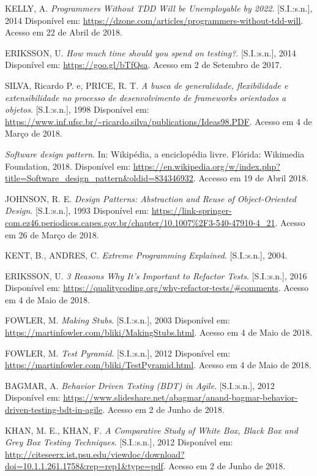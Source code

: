 \documentclass[
    12pt,       %
    openright,      %
    twoside,      %
    a4paper,      %
    english,      %
    french,       %
    spanish,      %
    brazil,       %
    ]{abntex2}
\begin{document}
  \noindent
  KELLY, A. \textit{Programmers Without TDD Will be Unemployable by 2022}. [S.I.:s.n.],
  2014 Disponível em: \url{https://dzone.com/articles/programmers-without-tdd-will}. Acesso em 22 de Abril de 2018.

  \noindent
  ERIKSSON, U. \textit{How much time should you spend on testing?}. [S.I.:s.n.], 2014 Disponível em:
  \url{https://goo.gl/bTfQsa}. Acesso em 2 de Setembro de 2017.

  \noindent
  SILVA, Ricardo P. e, PRICE, R. T. \textit{A busca de generalidade, flexibilidade e extensibilidade no processo de desenvolvimento de frameworks orientados a objetos}. [S.I.:s.n.], 1998 Disponível em: \url{https://www.inf.ufsc.br/~ricardo.silva/publications/Ideas98.PDF}. Acesso em 4 de Março de 2018.

  \noindent
  \textit{Software design pattern}. In: Wikipédia, a enciclopédia livre. Flórida: Wikimedia Foundation,
  2018. Disponível em:
  \url{https://en.wikipedia.org/w/index.php?title=Software_design_pattern&oldid=834346932}. Accesso
  em 19 de Abril 2018.

  \noindent
  JOHNSON, R. E. \textit{Design Patterns: Abstraction and Reuse of Object-Oriented Design}. [S.I.:s.n.], 1993 Disponível em: \url{https://link-springer-com.ez46.periodicos.capes.gov.br/chapter/10.1007%2F3-540-47910-4_21}. Acesso em 26 de Março de 2018.

  \noindent
  KENT, B., ANDRES, C. \textit{Extreme Programming Explained}. [S.I.:s.n.], 2004.

  \noindent
  ERIKSSON, U. \textit{3 Reasons Why It's Important to Refactor Tests}. [S.I.:s.n.], 2016 Disponível em:
  \url{https://qualitycoding.org/why-refactor-tests/#comments}. Acesso em 4 de Maio de 2018.

  \noindent
  FOWLER, M. \textit{Making Stubs}. [S.I.:s.n.], 2003 Disponível em:
  \url{https://martinfowler.com/bliki/MakingStubs.html}. Acesso em 4 de Maio de 2018.

  \noindent
  FOWLER, M. \textit{Test Pyramid}. [S.I.:s.n.], 2012 Disponível em:
  \url{https://martinfowler.com/bliki/TestPyramid.html}. Acesso em 4 de Maio de 2018.

  \noindent
  BAGMAR, A. \textit{Behavior Driven Testing (BDT) in Agile}. [S.I.:s.n.], 2012 Disponível em:
  \url{https://www.slideshare.net/abagmar/anand-bagmar-behavior-driven-testing-bdt-in-agile}. Acesso em 2 de Junho de 2018.

  \noindent
  KHAN, M. E., KHAN, F. \textit{A Comparative Study of White Box, Black Box and Grey Box Testing Techniques}. [S.I.:s.n.], 2012 Disponível em: \url{http://citeseerx.ist.psu.edu/viewdoc/download?doi=10.1.1.261.1758&rep=rep1&type=pdf}. Acesso em 2 de Junho de 2018.
\end{document}
